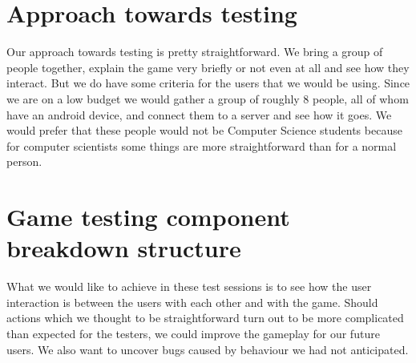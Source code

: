 \documentclass[a4paper,titlepage]{scrartcl}
\begin{document}
\section{Approach towards testing}
Our approach towards testing is pretty straightforward. We bring a group of people together, explain the game very briefly or not even at all and see how they interact. But we do have some criteria for the users that we would be using. Since we are on a low budget we would gather a group of roughly 8 people, all of whom have an android device, and connect them to a server and see how it goes. We would prefer that these people would not be Computer Science students because for computer scientists some things are more straightforward than for a normal person.

\section{Game testing component breakdown structure}
What we would like to achieve in these test sessions is to see how the user interaction is between the users with each other and with the game. Should actions which we thought to be straightforward turn out to be more complicated than expected for the testers, we could improve the gameplay for our future users. We also want to uncover bugs caused by behaviour we had not anticipated.
\end{document}
